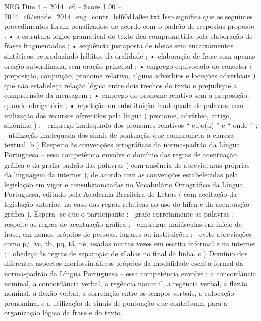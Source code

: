 \begin{textsample}{NEG Dim 4 – 2014\_c6 – Score 1.00 – 2014\_c6/enade\_2014\_eng\_contr\_b460d1a0ee.txt}
Isso significa que os seguintes procedimentos foram penalizados, de acordo com o padrão de respostas proposto : • a estrutura lógico-gramatical do texto fica comprometida pela elaboração de frases fragmentadas ; • sequência justaposta de ideias sem encaixamentos sintáticos, reproduzindo hábitos da oralidade ; • elaboração de frase com apenas oração subordinada, sem oração principal ; • emprego equivocado do conector ( preposição, conjunção, pronome relativo, alguns advérbios e locuções adverbiais ) que não estabeleça relação lógica entre dois trechos do texto e prejudique a compreensão da mensagem ; • emprego do pronome relativo sem a preposição, quando obrigatória ; • repetição ou substituição inadequada de palavras sem utilização dos recursos oferecidos pela língua ( pronome, advérbio, artigo, sinônimo ) ;  emprego inadequado dos pronomes relativos “ cujo(a) ” e “ onde ” ;  utilização inadequada dos sinais de pontuação que comprometa a clareza textual. b ) Respeito às convenções ortográficas da norma-padrão da Língua Portuguesa – essa competência envolve o domínio das regras de acentuação gráfica e da grafia padrão das palavras ( com ausência de abreviaturas próprias da linguagem da internet ), de acordo com as convenções estabelecidas pela legislação em vigor e consubstanciadas no Vocabulário Ortográfico da Língua Portuguesa, editado pela Academia Brasileira de Letras ( com aceitação da legislação anterior, no caso das regras relativas ao uso do hífen e da acentuação gráfica ).
Espera -se que o participante :  grafe corretamente as palavras ;  respeite as regras de acentuação gráfica ;  empregue maiúsculas em início de frase, em nomes próprios de pessoas, lugares ou instituições ;  evite abreviações como p/, vc, tb, pq, tá, né, usadas muitas vezes em escrita informal e na internet ;  obedeça às regras de separação de sílabas no final da linha. c ) Domínio dos diferentes aspectos morfossintáticos próprios da modalidade escrita formal da norma-padrão da Língua Portuguesa – essa competência envolve : a concordância nominal, a concordância verbal, a regência nominal, a regência verbal, a flexão nominal, a flexão verbal, a correlação entre os tempos verbais, a colocação pronominal e a utilização de sinais de pontuação que contribuam para a organização lógica da frase e do texto.

\end{textsample}
